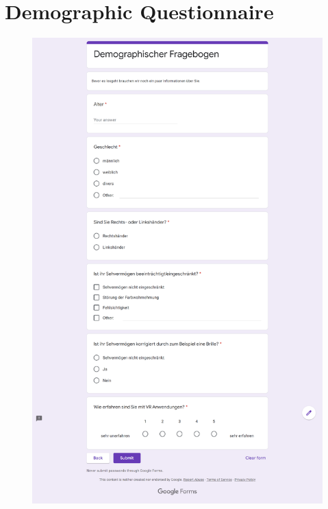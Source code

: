 \section{Demographic Questionnaire}
\begin{figure}[!h]
\centering
\includegraphics[width=\textwidth]{figures/Appendix/demographic questionair.png}
\end{figure}

